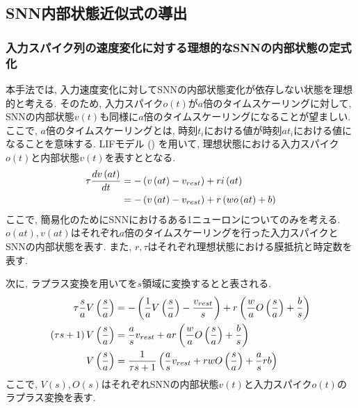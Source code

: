 \subsection{SNN内部状態近似式の導出}

\subsubsection{入力スパイク列の速度変化に対する理想的なSNNの内部状態の定式化}
本手法では, 入力速度変化に対してSNNの内部状態変化が依存しない状態を理想的と考える.
そのため, 入力スパイク$o(t)$が$a$倍のタイムスケーリングに対して, SNNの内部状態$v(t)$も同様に$a$倍のタイムスケーリングになることが望ましい.
ここで, $a$倍のタイムスケーリングとは, 時刻$t_i$における値が時刻$at_i$における値になることを意味する.
LIFモデル () を用いて, 理想状態における入力スパイク$o(t)$と内部状態$v(t)$を表すととなる.
\begin{align}
    \tau \frac{dv\left(at\right)}{dt} &= -\left(v\left(at\right) - v_{rest}\right) + r i\left(at\right) \notag \\
     &= -\left(v\left(at\right) - v_{rest}\right) + r \left( wo\left(at\right) + b \right) \label{eq:ideal:state}
\end{align}
ここで, 簡易化のためにSNNにおけるある1ニューロンについてのみを考える.
$o(at), v(at)$はそれぞれ$a$倍のタイムスケーリングを行った入力スパイクとSNNの内部状態を表す.
また, $r, \tau$はそれぞれ理想状態における膜抵抗と時定数を表す.

次に, ラプラス変換を用いてを$s$領域に変換するとと表される.
\begin{align}
    \tau \frac{s}{a} V\left(\frac{s}{a}\right) &= -\left(\frac{1}{a} V\left(\frac{s}{a}\right) 
    - \frac{v_{rest}}{s}\right) + r \left( \frac{w}{a} O\left(\frac{s}{a}\right) + \frac{b}{s} \right) \notag \\
    \left(\tau s +1\right) V\left(\frac{s}{a}\right)  &= \frac{a}{s} v_{rest} +ar \left( \frac{w}{a} O\left(\frac{s}{a}\right) + \frac{b}{s} \right) \notag \\
    V\left(\frac{s}{a}\right) &=  \frac{1}{\tau s +1}\left( \frac{a}{s} v_{rest} +rw O\left(\frac{s}{a}\right) + \frac{a}{s}rb \right) \label{eq:ideal:state:laplace}
\end{align}
ここで, $V(s), O(s)$はそれぞれSNNの内部状態$v(t)$と入力スパイク$o(t)$のラプラス変換を表す.


